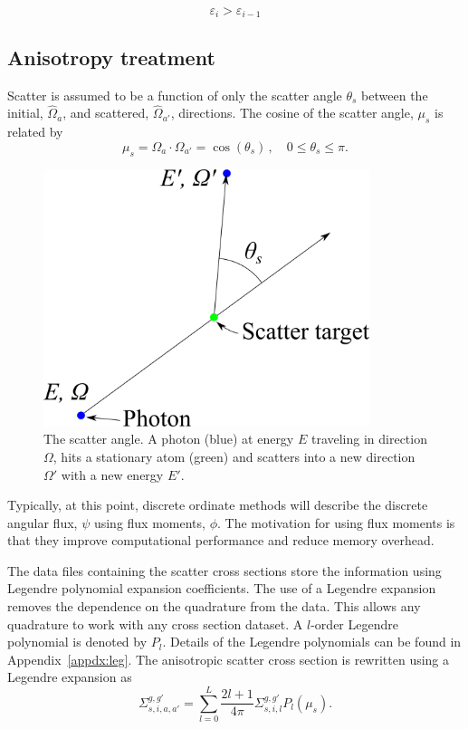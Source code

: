 \begin{equation}\label{eq:conv4}
\varepsilon_i > \varepsilon_{i-1}
\end{equation}

\subsection{Anisotropy treatment}\label{sec:aniso}

Scatter is assumed to be a function of only the scatter angle $\theta_s$ between the initial, $\hat{\Omega}_a$, and scattered, $\hat{\Omega}_{a'}$, directions. The cosine of the scatter angle, $\mu_s$ is related by 
\begin{equation} \label{eq:scat_cos}
\mu_s = \Omega_a \cdot \Omega_{a'} = \cos(\theta_s) \,, \quad 0 \leq \theta_s \leq \pi.
\end{equation}

\begin{figure}[tb]
  \begin{center}
   \includegraphics[width=3.75in]{figs/scat_ang}
  \end{center}
  \caption{The scatter angle. A photon (blue) at energy $E$ traveling in direction $\Omega$, hits a stationary atom (green) and scatters into a new direction $\Omega'$ with a new energy $E'$.}
\label{fig:scat_ang}
\end{figure}%

Typically, at this point, discrete ordinate methods will describe the discrete angular flux, $\psi$ using flux moments, $\phi$. The motivation for using flux moments is that they improve computational performance and reduce memory overhead.

The data files containing the scatter cross sections store the information using Legendre polynomial expansion coefficients. The use of a Legendre expansion removes the dependence on the quadrature from the data. This allows any quadrature to work with any cross section dataset. A $l$-order Legendre polynomial is denoted by $P_l$. Details of the Legendre polynomials can be found in Appendix~\ref{appdx:leg}. The anisotropic scatter cross section is rewritten using a Legendre expansion as
\begin{equation} \label{eq:leg_1}
\Sigma_{s, i, a, a'}^{g, g'} = \sum_{l=0}^L \frac{2l+1}{4 \pi}\Sigma_{s, i, l}^{g, g'} P_l(\mu_s).
\end{equation}

